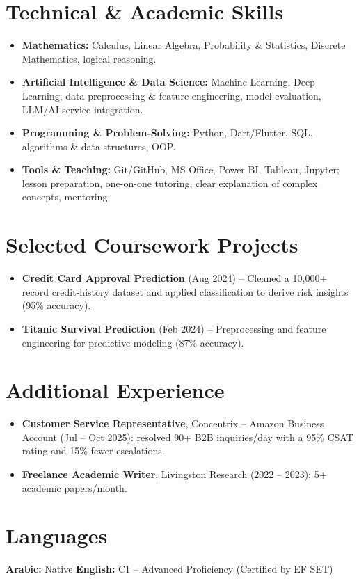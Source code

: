 \documentclass[11pt,a4paper]{article}
\begin{document}
\section{Technical \& Academic Skills}
\begin{itemize}
  \item \textbf{Mathematics:} Calculus, Linear Algebra, Probability \& Statistics, Discrete Mathematics, logical reasoning.
  \item \textbf{Artificial Intelligence \& Data Science:} Machine Learning, Deep Learning, data
        preprocessing \& feature engineering, model evaluation, LLM/AI service integration.
  \item \textbf{Programming \& Problem-Solving:} Python, Dart/Flutter, SQL, algorithms \& data structures, OOP.
  \item \textbf{Tools \& Teaching:} Git/GitHub, MS Office, Power BI, Tableau, Jupyter; lesson
        preparation, one-on-one tutoring, clear explanation of complex concepts, mentoring.
\end{itemize}

\section{Selected Coursework Projects}
\begin{itemize}
  \item \textbf{Credit Card Approval Prediction} (Aug 2024) -- Cleaned a 10,000+ record
        credit-history dataset and applied classification to derive risk insights (95\% accuracy).
  \item \textbf{Titanic Survival Prediction} (Feb 2024) -- Preprocessing and feature
        engineering for predictive modeling (87\% accuracy).
\end{itemize}

\section{Additional Experience}
\begin{itemize}
  \item \textbf{Customer Service Representative}, Concentrix -- Amazon Business Account
        (Jul -- Oct 2025): resolved 90+ B2B inquiries/day with a 95\% CSAT rating and 15\% fewer escalations.
  \item \textbf{Freelance Academic Writer}, Livingston Research (2022 -- 2023): 5+ academic papers/month.
\end{itemize}

\section{Languages}
\noindent
\textbf{Arabic:} Native \quad\textbar\quad
\textbf{English:} C1 -- Advanced Proficiency (Certified by EF SET)
\end{document}
